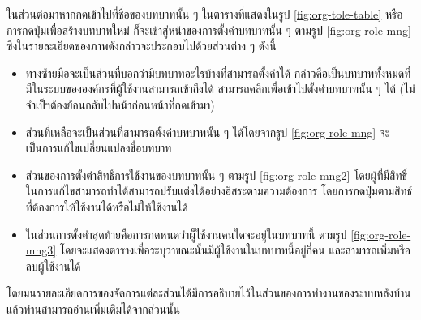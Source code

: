 \ifenglish \else
ในส่วนต่อมาหากกดเข้าไปที่ชื่อของบทบาทนั้น ๆ ในตารางที่แสดงในรูป \ref{fig:org-tole-table} หรือการกดปุ่มเพื่อสร้างบทบาทใหม่ ก็จะเข้าสู่หน้าของการตั้งค่าบทบาทนั้น ๆ ตามรูป \ref{fig:org-role-mng} ซึ่งในรายละเอียดของภาพดังกล่าวจะประกอบไปด้วยส่วนต่าง ๆ ดังนี้
\begin{itemize}
    \item ทางซ้ายมือจะเป็นส่วนที่บอกว่ามีบทบาทอะไรบ้างที่สามารถตั้งค่าได้ กล่าวคือเป็นบทบาททั้งหมดที่มีในระบบขององค์กรที่ผู้ใช้งานสามารถเข้าถึงได้ สามารถคลิกเพื่อเข้าไปตั้งค่าบทบาทนั้น ๆ ได้ (ไม่จำเป็ฯต้องย้อนกลับไปหน้าก่อนหน้าที่กดเข้ามา)
    \item ส่วนที่เหลือจะเป็นส่วนที่สามารถตั้งค่าบทบาทนั้น ๆ ได้โดยจากรูป \ref{fig:org-role-mng} จะเป็นการแก้ไขเปลี่ยนแปลงชื่อบทบาท
    \item ส่วนของการตั้งต่าสิทธิ์การใช้งานของบทบาทนั้น ๆ ตามรูป \ref{fig:org-role-mng2} โดยผู้ที่มีสิทธิ์ในการแก้ไขสามารถทำได้สามารถปรับแต่งได้อย่างอิสระตามความต้องการ โดยการกดปุ่มตามสิทธ์ที่ต้องการให้ใช้งานได้หรือไม่ให้ใช้งานได้
    \item ในส่วนการตั้งค่าสุดท้ายคือการกดหนดว่าผู็ใช้งานคนใดจะอยู่ในบทบาทนี้ ตามรูป \ref{fig:org-role-mng3} โดยจะแสดงตารางเพื่อระบุว่าขณะนั้นมีผู้ใช้งานในบทบาทนี้อยู่กี่คน และสามารถเพิ่มหรือลบผู้ใช้งานได้
\end{itemize}
โดยมนรายละเอียดการของจัดการแต่ละส่วนได้มีการอธิบายไว้ในส่วนของการทำงานของระบบหลังบ้านแล้วท่านสามารถอ่านเพิ่มเติมได้จากส่วนนั้น
\fi

